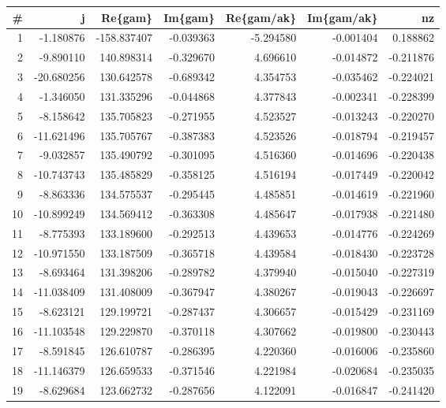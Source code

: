\begin{tabular}{rrrrrrr}
\toprule
  \# &          j &     Re\{gam\} &   Im\{gam\} &  Re\{gam/ak\} &  Im\{gam/ak\} &        nz \\
\midrule
  1 &  -1.180876 & -158.837407 & -0.039363 &   -5.294580 &   -0.001404 &  0.188862 \\
  2 &  -9.890110 &  140.898314 & -0.329670 &    4.696610 &   -0.014872 & -0.211876 \\
  3 & -20.680256 &  130.642578 & -0.689342 &    4.354753 &   -0.035462 & -0.224021 \\
  4 &  -1.346050 &  131.335296 & -0.044868 &    4.377843 &   -0.002341 & -0.228399 \\
  5 &  -8.158642 &  135.705823 & -0.271955 &    4.523527 &   -0.013243 & -0.220270 \\
  6 & -11.621496 &  135.705767 & -0.387383 &    4.523526 &   -0.018794 & -0.219457 \\
  7 &  -9.032857 &  135.490792 & -0.301095 &    4.516360 &   -0.014696 & -0.220438 \\
  8 & -10.743743 &  135.485829 & -0.358125 &    4.516194 &   -0.017449 & -0.220042 \\
  9 &  -8.863336 &  134.575537 & -0.295445 &    4.485851 &   -0.014619 & -0.221960 \\
 10 & -10.899249 &  134.569412 & -0.363308 &    4.485647 &   -0.017938 & -0.221480 \\
 11 &  -8.775393 &  133.189600 & -0.292513 &    4.439653 &   -0.014776 & -0.224269 \\
 12 & -10.971550 &  133.187509 & -0.365718 &    4.439584 &   -0.018430 & -0.223728 \\
 13 &  -8.693464 &  131.398206 & -0.289782 &    4.379940 &   -0.015040 & -0.227319 \\
 14 & -11.038409 &  131.408009 & -0.367947 &    4.380267 &   -0.019043 & -0.226697 \\
 15 &  -8.623121 &  129.199721 & -0.287437 &    4.306657 &   -0.015429 & -0.231169 \\
 16 & -11.103548 &  129.229870 & -0.370118 &    4.307662 &   -0.019800 & -0.230443 \\
 17 &  -8.591845 &  126.610787 & -0.286395 &    4.220360 &   -0.016006 & -0.235860 \\
 18 & -11.146379 &  126.659533 & -0.371546 &    4.221984 &   -0.020684 & -0.235035 \\
 19 &  -8.629684 &  123.662732 & -0.287656 &    4.122091 &   -0.016847 & -0.241420 \\

\end{tabular}
